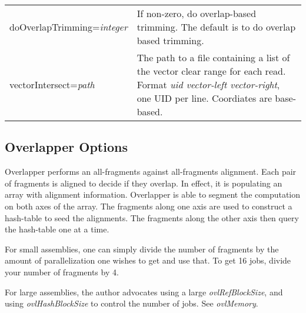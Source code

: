 \documentclass[twoside,11pt]{article}
\begin{document}
\begin{longtable}{lp{3.0in}}
doOverlapTrimming={\it integer} &
If non-zero, do overlap-based trimming.  The default is to do overlap
based trimming.
\\

vectorIntersect={\it path} &
The path to a file containing a list of the vector clear range for
each read.  Format {\it uid vector-left vector-right}, one UID per
line.  Coordiates are base-based.
\\

\end{longtable}


\subsection{Overlapper Options}
\label{sec:overlapopts}

Overlapper performs an all-fragments against all-fragments alignment.
Each pair of fragments is aligned to decide if they overlap.  In
effect, it is populating an array with alignment information.
Overlapper is able to segment the computation on both axes of the
array.  The fragments along one axis are used to construct a
hash-table to seed the alignments.  The fragments along the other axis
then query the hash-table one at a time.

For small assemblies, one can simply divide the number of fragments by
the amount of parallelization one wishes to get and use that.  To get
16 jobs, divide your number of fragments by 4.

For large assemblies, the author advocates using a large {\it
ovlRefBlockSize}, and using {\it ovlHashBlockSize} to control the number of
jobs.  See {\it ovlMemory}.
\end{document}
